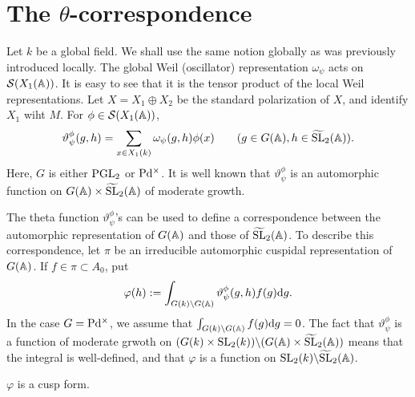 \section{The $\theta$-correspondence}
\label{sec:3}

Let $k$ be a global field.
We shall use the same notion globally as was previously introduced locally.
The global Weil (oscillator) representation $\omega_\psi$ acts on $\mathcal{S}(X_1(\mathbb{A}))$.
It is easy to see that it is the tensor product of the local Weil representations.
Let $X = X_1 \oplus X_2$ be the standard polarization of $X$, and identify $X_1$ wiht $M$.
For $\phi \in \mathcal{S}(X_1(\mathbb{A}))$,
\[
\vartheta_\psi^\phi(g, h) = \sum_{x \in X_1(k)} \omega_\psi(g, h) \phi(x)\qquad (g \in G(\mathbb{A}), h \in \widetilde{\mathrm{SL}}_2(\mathbb{A})).
\]
Here, $G$ is either $\mathrm{PGL}_2$ or $\mathrm{P} \mathrm{d}^\times$.
It is well known that $\vartheta_\psi^\phi$ is an automorphic function on $G(\mathbb{A}) \times \widetilde{\mathrm{SL}}_2(\mathbb{A})$ of moderate growth.

The theta function $\vartheta_\psi^\phi$'s can be used to define a correspondence between the automorphic representation of $G(\mathbb{A})$ and those of $\widetilde{\mathrm{SL}}_2(\mathbb{A})$.
To describe this correspondence, let $\pi$ be an irreducible automorphic cuspidal representation of $G(\mathbb{A})$.
If $f \in \pi \subset A_0$, put
\[
\varphi(h) := \int_{G(k) \backslash G(\mathbb{A})} \vartheta_\psi^\phi(g, h) f(g) \mathrm{d} g.
\]
In the case $G = \mathrm{P} \mathrm{d}^\times$, we assume that $\int_{G(k)\backslash G(\mathbb{A})} f(g) \mathrm{d} g = 0$.
The fact that $\vartheta_\psi^\phi$ is a function of moderate grwoth on $(G(k) \times \mathrm{SL}_2(k)) \backslash (G(\mathbb{A}) \times \widetilde{\mathrm{SL}}_2(\mathbb{A}))$ means that the integral is well-defined, and that $\varphi$ is a function on $\mathrm{SL}_2(k) \backslash \widetilde{\mathrm{SL}}_2(\mathbb{A})$.

\begin{claim}
$\varphi$ is a cusp form.
\end{claim}

